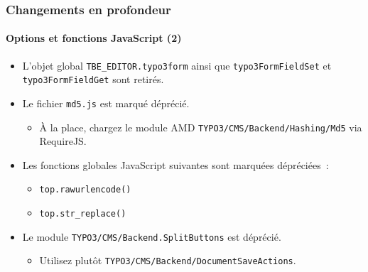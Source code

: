 \begin{frame}[fragile]
	\frametitle{Changements en profondeur}
	\framesubtitle{Options et fonctions JavaScript (2)}

	\begin{itemize}

		\item L'objet global \texttt{TBE\_EDITOR.typo3form} ainsi que \texttt{typo3FormFieldSet}
			et \texttt{typo3FormFieldGet} sont retirés.

		\item Le fichier \texttt{md5.js} est marqué déprécié.

			\begin{itemize}\smaller
				\item[\ding{228}] À la place, chargez le module AMD \texttt{TYPO3/CMS/Backend/Hashing/Md5} via RequireJS\@.
			\end{itemize}\normalsize

		\item Les fonctions globales JavaScript suivantes sont marquées dépréciées~:

		\begin{itemize}
			\item \texttt{top.rawurlencode()}
			\item \texttt{top.str\_replace()}
		\end{itemize}

		\item Le module \texttt{TYPO3/CMS/Backend.SplitButtons} est déprécié.

			\begin{itemize}\smaller
				\item[\ding{228}] Utilisez plutôt \texttt{TYPO3/CMS/Backend/DocumentSaveActions}.
			\end{itemize}\normalsize

 	\end{itemize}

\end{frame}


